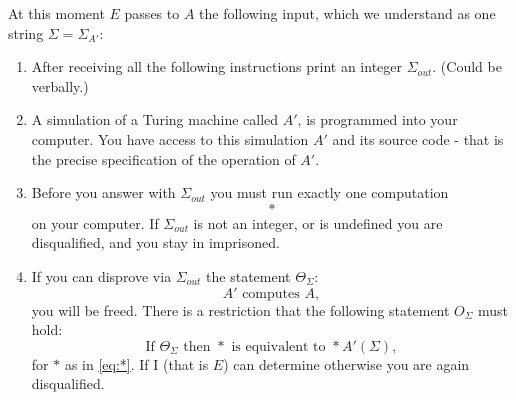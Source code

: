 \documentclass[9pt,twocolumn,twoside,lineno]{pnas-new}
\numberwithin{equation}{section}
\theoremstyle{definition}
\theoremstyle{remark}
\begin{document}
At this moment $E$ passes to $A$ the following input, which we understand as one string $\Sigma = \Sigma _{A'} $:  
\begin{enumerate}
\item  \label{itemAdd} After receiving all the following instructions print an integer $\Sigma _{out} $.
(Could be verbally.) 
\item   A simulation of a Turing machine called $A'$,
is programmed into your computer.
You have access to this simulation $A'$ and its source code - that is the precise specification of the operation of $A'$. \label{itemTuring} 
\item 
   Before you answer with $\Sigma _{out} $ you must run exactly one computation 
     \begin{equation} \label{eq:*}
     *
     \end{equation} 
       on your computer. 
If $\Sigma _{out} $ is not an integer, or is undefined  you are disqualified, and you stay in imprisoned.  \item \label{itemDisprove}   If you can disprove via $\Sigma _{out} $ the statement $\Theta _{\Sigma} $:
        \begin{equation*}
        A' \text{ computes } A,
        \end{equation*}  you will be freed.  
 There is a restriction that the following statement $O _{\Sigma} $ must hold:
      \begin{equation*}
      \text{If } \Theta _{\Sigma} \text{ then } * \text{ is equivalent to } *A' (\Sigma),
      \end{equation*} 
       for $*$ as in \eqref{eq:*}.
 If I (that is $E$) can determine otherwise you are again disqualified.   

\end{enumerate} 
\end{document}
